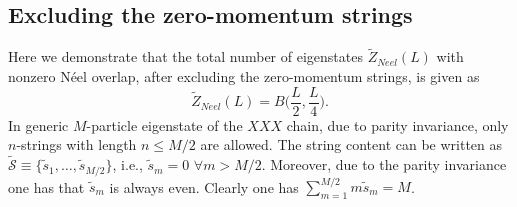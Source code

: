 \documentclass[11pt]{iopart}
\begin{document}
\subsection{Excluding the zero-momentum strings}
\label{app-1.2}

Here we demonstrate that the total number of eigenstates $\widetilde Z_{Neel}(L)$ 
with nonzero N\'eel overlap, after excluding the zero-momentum strings, is given as 
%
\begin{equation}
\widetilde Z_{Neel}(L)=B\Big(\frac{L}{2},\frac{L}{4}\Big). 
\end{equation}
%
In  generic $M$-particle eigenstate of the $XXX$ chain, due to parity invariance, only 
$n$-strings with length $n\le M/2$ are allowed. The string content can be written as 
$\widetilde{\mathcal S}\equiv\{\tilde s_1,\dots,\tilde s_{M/2}\}$, i.e., $\tilde s_m=0$ 
$\forall m>M/2$. Moreover, due to the parity invariance one has that $\tilde s_m$ is 
always even. Clearly one has $\sum_{m=1}^{M/2}m \tilde s_m=M$. 
\end{document}
